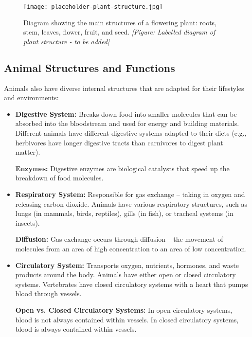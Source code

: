 \begin{figure}
\centering
\texttt{[image: placeholder-plant-structure.jpg]}
\caption{Diagram showing the main structures of a flowering plant: roots, stem, leaves, flower, fruit, and seed. \textit{[Figure: Labelled diagram of plant structure - to be added]}}
\end{figure}


\subsection{Animal Structures and Functions}

Animals also have diverse internal structures that are adapted for their lifestyles and environments:

\begin{itemize}
    \item \textbf{Digestive System:} Breaks down food into smaller molecules that can be absorbed into the bloodstream and used for energy and building materials.  Different animals have different digestive systems adapted to their diets (e.g., herbivores have longer digestive tracts than carnivores to digest plant matter).
    \begin{marginnote}
        \textbf{Enzymes:} Digestive enzymes are biological catalysts that speed up the breakdown of food molecules.
    \end{marginnote}
    \item \textbf{Respiratory System:}  Responsible for gas exchange – taking in oxygen and releasing carbon dioxide.  Animals have various respiratory structures, such as lungs (in mammals, birds, reptiles), gills (in fish), or tracheal systems (in insects).
    \begin{marginnote}
        \textbf{Diffusion:} Gas exchange occurs through diffusion – the movement of molecules from an area of high concentration to an area of low concentration.
    \end{marginnote}
    \item \textbf{Circulatory System:} Transports oxygen, nutrients, hormones, and waste products around the body.  Animals have either open or closed circulatory systems.  Vertebrates have closed circulatory systems with a heart that pumps blood through vessels.
    \begin{marginnote}
        \textbf{Open vs. Closed Circulatory Systems:} In open circulatory systems, blood is not always contained within vessels. In closed circulatory systems, blood is always contained within vessels.

\end{marginnote}
\end{itemize}
